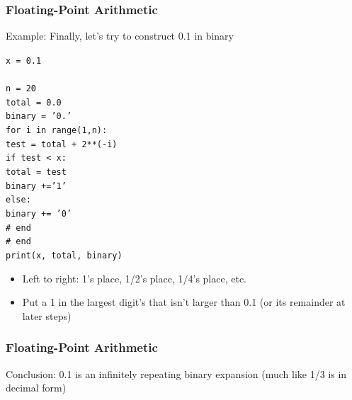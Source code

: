 \documentclass{beamer}
\newcommand{\code}[1]{\texttt{#1}}
\newcommand{\tab}{\hspace*{22pt}}
\begin{document}
\begin{frame}	
	\frametitle{Floating-Point Arithmetic}
	
	\begin{block}{Example:}
		Finally, let's try to construct 0.1 in binary
			
		\vspace{5pt}
			\begin{scriptsize}
			\code{x = 0.1 \\[-5pt]
			\tab \\[-5pt]
			n = 20 \\[-5pt]
			total = 0.0 \\[-5pt]
			binary = '0.' \\[-5pt]
			for i in range(1,n): \\[-5pt]
			\tab test = total + 2**(-i) \\[-5pt]
    			\tab if test < x: \\[-5pt]
			\tab \tab total = test \\[-5pt]
			\tab \tab binary +='1' \\[-5pt]
			\tab else: \\[-5pt]
			\tab \tab binary += '0' \\[-5pt]
			\tab \# end \\[-5pt]
			\# end \\[-5pt]
			print(x, total, binary)
			}
			\end{scriptsize}
		\endminipage\hfill
			\begin{itemize}
				\item Left to right: 1's place, 1/2's place, 1/4's place, etc.
				\item Put a 1 in the largest digit's that isn't larger than 0.1 (or its remainder at later steps)
			\end{itemize}
		\endminipage\hfill
	\end{block}
	
\end{frame}

\begin{frame}	
	\frametitle{Floating-Point Arithmetic}
	
	\begin{block}{Conclusion:}
		0.1 is an infinitely repeating binary expansion (much like 1/3 is in decimal form)
	\end{block}
	
\end{frame}

\end{document}
